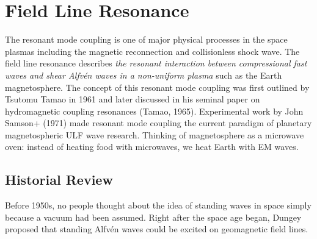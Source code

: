 \documentclass[
  notoc %
]{tufte-book}
\begin{document}
\hypertarget{sec:flr}{%
\chapter{Field Line Resonance}\label{sec:flr}}

The resonant mode coupling is one of major physical processes in the
space plasmas including the magnetic reconnection and collisionless
shock wave. The field line resonance describes \emph{the resonant
interaction between compressional fast waves and shear Alfvén waves in a
non-uniform plasma} such as the Earth magnetosphere. The concept of this
resonant mode coupling was first outlined by Tsutomu Tamao in 1961 and
later discussed in his seminal paper on hydromagnetic coupling
resonances (Tamao, 1965). Experimental work by John Samson+ (1971) made
resonant mode coupling the current paradigm of planetary magnetospheric
ULF wave research. Thinking of magnetosphere as a microwave oven:
instead of heating food with microwaves, we heat Earth with EM waves.

\hypertarget{historial-review}{%
\section{Historial Review}\label{historial-review}}

Before 1950s, no people thought about the idea of standing waves in
space simply because a vacuum had been assumed. Right after the space
age began, Dungey proposed that standing Alfvén waves could be excited
on geomagnetic field lines.
\end{document}
